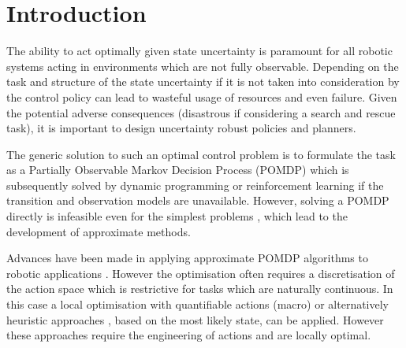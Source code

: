 \documentclass[final,5p,times,twocolumn]{elsarticle}
\begin{document}
\section{Introduction}

The ability to act optimally given state uncertainty is paramount for all robotic systems acting in 
environments which are not fully observable. Depending on the task and structure of the state
uncertainty if it is not taken into consideration by the control policy can lead to wasteful usage of resources 
and even failure. Given the potential adverse consequences (disastrous if considering a search and rescue task), 
it is important to design uncertainty robust policies and planners.

The generic solution to such an optimal control problem is to formulate the task as a
Partially Observable Markov Decision Process (POMDP) which is subsequently solved by dynamic programming
or reinforcement learning if the transition and observation models are unavailable. 
However, solving a POMDP directly is infeasible even for the simplest problems \cite{PBVI_2003}, which 
lead to the development of approximate methods. 

Advances have been made in applying approximate POMDP algorithms to robotic applications
\cite{pomdp_peg_icra_2014}. However the optimisation often requires a discretisation of the 
action space which is restrictive for tasks which are naturally continuous. In this case
a local optimisation with quantifiable actions (macro) \cite{toussain_2015} or alternatively heuristic 
approaches \cite{Lauri2016}, based on the most likely state, can be applied. However these approaches require 
the engineering of actions and are locally optimal. 

\end{document}
